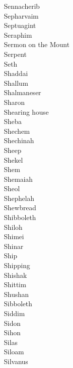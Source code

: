 Sennacherib  \\
Sepharvaim  \\
Septuagint  \\
Seraphim  \\
Sermon on the Mount  \\
Serpent  \\
Seth  \\
Shaddai  \\
Shallum  \\
Shalmaneser  \\
Sharon  \\
Shearing house  \\
Sheba  \\
Shechem  \\
Shechinah  \\
Sheep  \\
Shekel  \\
Shem  \\
Shemaiah  \\
Sheol  \\
Shephelah  \\
Shewbread  \\
Shibboleth  \\
Shiloh  \\
Shimei  \\
Shinar  \\
Ship  \\
Shipping  \\
Shishak  \\
Shittim  \\
Shushan  \\
Sibboleth  \\
Siddim  \\
Sidon  \\
Sihon  \\
Silas  \\
Siloam  \\
Silvanus  \\
